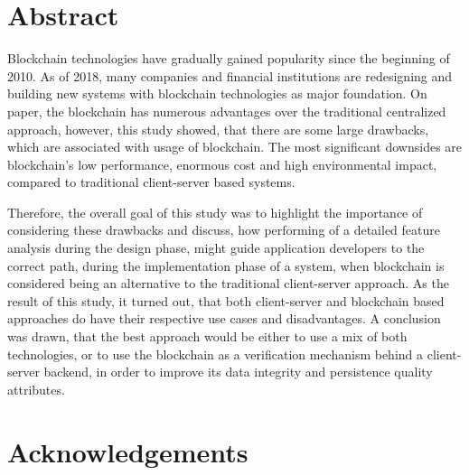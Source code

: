 \section*{Abstract}

Blockchain technologies have gradually gained popularity since the beginning of 2010. As of 2018, many companies and financial institutions are redesigning and building new systems with blockchain technologies as major foundation. On paper, the blockchain has numerous advantages over the traditional centralized approach, however, this study showed, that there are some large drawbacks, which are associated with usage of blockchain. The most significant downsides are blockchain's low performance, enormous cost and high environmental impact, compared to traditional client-server based systems. 

Therefore, the overall goal of this study was to highlight the importance of considering these drawbacks and discuss, how performing of a detailed feature analysis during the design phase, might guide application developers to the correct path, during the implementation phase of a system, when blockchain is considered being an alternative to the traditional client-server approach. As the result of this study, it turned out, that both client-server and blockchain based approaches do have their respective use cases and disadvantages. A conclusion was drawn, that the best approach would be either to use a mix of both technologies, or to use the blockchain as a verification mechanism behind a client-server backend, in order to improve its data integrity and persistence quality attributes.

\pagebreak

\section*{Acknowledgements}

